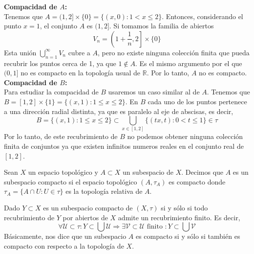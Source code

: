 {    \textbf{Compacidad de $A$:} \\
    Tenemos que $A = (1,2] \times \{0\} = \{(x,0) : 1 < x \leq 2\}$. Entonces, considerando el punto $x = 1$, el conjunto $A$ es $(1,2]$. Si tomamos la familia de abiertos
    $$V_n = \left(1 + \frac{1}{n}, 2\right] \times \{0\}$$
    Esta unión $\bigcup_{n=1}^{\infty} V_n$ cubre a $A$, pero no existe ninguna colección finita que pueda recubrir los puntos cerca de 1, ya que $1 \notin A$. Es el mismo argumento por el que $(0,1]$ no es compacto en la topología usual de $\mathbb{R}$. Por lo tanto, $A$ no es compacto.\\


    \textbf{Compacidad de $B$:} \\
    Para estudiar la compacidad de $B$ usaremos un caso similar al de $A$. Tenemos que $B = [1,2] \times \{1\} = \{(x,1) : 1 \leq x \leq 2\}$. En $B$ cada uno de los puntos pertenece a una dirección radial distinta, ya que es paralelo al eje de abscisas, es decir, 
    $$B = \{(x,1) : 1 \leq x \leq 2\} \subset \bigcup_{x \in [1,2]} \{(tx, t) : 0 < t \leq 1\} \in \tau$$
    Por lo tanto, de este recubrimiento de $B$ no podemos obtener ninguna colección finita de conjuntos ya que existen infinitos numeros reales en el conjunto real de $[1,2]$. 
}
\begin{definición}
    Sean $X$ un espacio topológico y $A \subset X$ un subespacio de $X$. Decimos que $A$ es un subespacio compacto si el espacio topológico $(A, \tau_A)$ es compacto donde $\tau_A = \{A \cap U : U \in \tau\}$ es la topología relativa de $A$.
\end{definición}
\begin{proposición}
    Dado $Y \subset X$ es un subespacio compacto de $(X, \tau)$ si y sólo si todo recubrimiento de $Y$ por abiertos de $X$ admite un recubrimiento finito. Es decir,
    $$\forall \mathcal{U} \subset \tau : Y \subset \bigcup \mathcal{U} \Rightarrow \exists \mathcal{V} \subset \mathcal{U} \text{ finito } : Y \subset \bigcup \mathcal{V}$$
    Básicamente, nos dice que un subespacio $A$ es compacto si y sólo si también es compacto con respecto a la topología de $X$.
\end{proposición}
